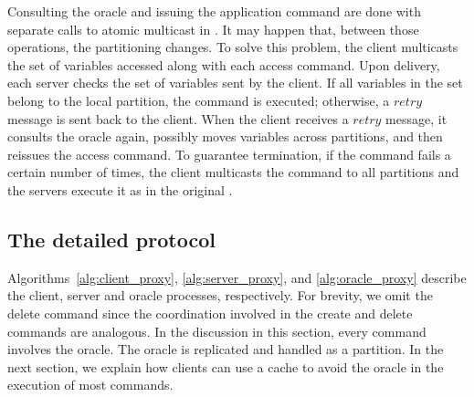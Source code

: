 Consulting the oracle and issuing the application command are done with separate calls to atomic multicast in \dynastar.
It may happen that, between those operations, the partitioning changes.
To solve this problem, the client multicasts the set of variables accessed along with each access command.
Upon delivery, each server checks the set of variables sent by the client.
If all variables in the set belong to the local partition, the command is executed; otherwise, a $retry$ message is sent back to the client.
When the client receives a $retry$ message, it consults the oracle again, possibly moves variables across partitions, and then reissues the access command.
To guarantee termination, if the command fails a certain number of times, the client multicasts the command to all partitions and the servers execute it as in the original \ssmr{}.



\subsection{The detailed protocol}

Algorithms~\ref{alg:client_proxy}, \ref{alg:server_proxy}, and \ref{alg:oracle_proxy} describe the client, server and oracle processes, respectively. 
For brevity, we omit the delete command since the coordination involved in the create and delete commands are analogous. 
In the discussion in this section, every command involves the oracle.
The oracle is replicated and handled as a partition.
In the next section, we explain how clients can use a cache to avoid the oracle in the execution of most commands.


